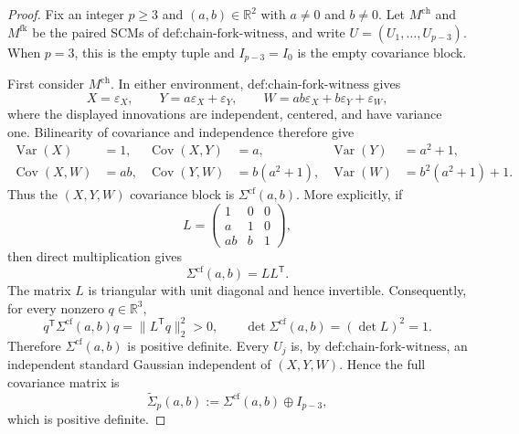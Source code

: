 \documentclass{article}
\begin{document}
\begin{proof}
Fix an integer \(p\ge3\) and \((a,b)\in\mathbb R^2\) with \(a\neq0\) and \(b\neq0\). Let \(M^{\mathrm{ch}}\) and \(M^{\mathrm{fk}}\) be the paired SCMs of \(\text{def:chain-fork-witness}\), and write \(U=(U_1,\ldots,U_{p-3})\). When \(p=3\), this is the empty tuple and \(I_{p-3}=I_0\) is the empty covariance block.

First consider \(M^{\mathrm{ch}}\). In either environment, \(\text{def:chain-fork-witness}\) gives
\[
X=\varepsilon_X,\qquad Y=a\varepsilon_X+\varepsilon_Y,
\qquad W=ab\varepsilon_X+b\varepsilon_Y+\varepsilon_W,
\]
where the displayed innovations are independent, centered, and have variance one. Bilinearity of covariance and independence therefore give
\[
\begin{aligned}
 \operatorname{Var}(X)&=1,
 &\operatorname{Cov}(X,Y)&=a,
 &\operatorname{Var}(Y)&=a^2+1,\\
 \operatorname{Cov}(X,W)&=ab,
 &\operatorname{Cov}(Y,W)&=b(a^2+1),
 &\operatorname{Var}(W)&=b^2(a^2+1)+1.
\end{aligned}
\]
Thus the \((X,Y,W)\) covariance block is \(\Sigma^{\mathrm{cf}}(a,b)\). More explicitly, if
\[
 L=\begin{pmatrix}1&0&0\\a&1&0\\ab&b&1\end{pmatrix},
\]
then direct multiplication gives
\[
 \Sigma^{\mathrm{cf}}(a,b)=LL^{\mathsf T}.
\]
The matrix \(L\) is triangular with unit diagonal and hence invertible. Consequently, for every nonzero \(q\in\mathbb R^3\),
\[
 q^{\mathsf T}\Sigma^{\mathrm{cf}}(a,b)q
 =\lVert L^{\mathsf T}q\rVert_2^2>0,
 \qquad
 \det\Sigma^{\mathrm{cf}}(a,b)=(\det L)^2=1.
\]
Therefore \(\Sigma^{\mathrm{cf}}(a,b)\) is positive definite. Every \(U_j\) is, by \(\text{def:chain-fork-witness}\), an independent standard Gaussian independent of \((X,Y,W)\). Hence the full covariance matrix is
\[
 \widetilde\Sigma_p(a,b)
 :=\Sigma^{\mathrm{cf}}(a,b)\oplus I_{p-3},
\]
which is positive definite.


\end{proof}
\end{document}
